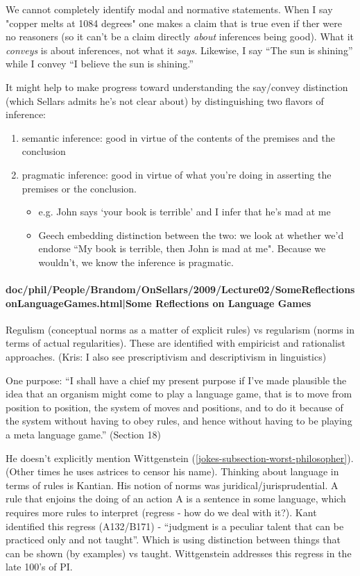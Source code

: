 \documentclass[12pt,a4paper]{report}
\begin{document}
We cannot completely identify modal and normative statements. When I say "copper melts at 1084 degrees" one makes a claim that is true even if ther were no reasoners (so it can't be a claim directly \emph{about} inferences being good). What it \emph{conveys} is about inferences, not what it \emph{says}. Likewise, I say ``The sun is shining'' while I convey ``I believe the sun is shining.''

It might help to make progress toward understanding the say/convey distinction (which Sellars admits he's not clear about) by distinguishing two flavors of inference:
\begin{enumerate}
\item semantic inference: good in virtue of the contents of the premises and the conclusion
\item pragmatic inference: good in virtue of what you're doing in asserting the premises or the conclusion.
 \begin{itemize}
 \item e.g. John says `your book is terrible' and I infer that he's mad at me
 \item Geech embedding distinction between the two: we look at whether we'd endorse ``My book is terrible, then John is mad at me". Because we wouldn't, we know the inference is pragmatic.

 \end{itemize}
\end{enumerate}
\paragraph{doc/phil/People/Brandom/OnSellars/2009/Lecture02/SomeReflectionsonLanguageGames.html|Some Reflections on Language Games}

Regulism (conceptual norms as a matter of explicit rules) vs regularism (norms in terms of actual regularities). These are identified with empiricist and rationalist approaches. (Kris: I also see prescriptivism and descriptivism in linguistics)

One purpose: ``I shall have a chief my present purpose if I've made plausible the idea that an organism might come to play a language game, that is to move from position to position, the system of moves and positions, and to do it because of the system without having to obey rules, and hence without having to be playing a meta language game.'' (Section 18)

He doesn't explicitly mention Wittgenstein (\ref{jokes-subsection-worst-philosopher}). (Other times he uses astrices to censor his name). Thinking about language in terms of rules is Kantian. His notion of norms was juridical/jurisprudential. A rule that enjoins the doing of an action A is a sentence in some language, which requires more rules to interpret (regress - how do we deal with it?). Kant identified this regress (A132/B171) - ``judgment is a peculiar talent that can be practiced only and not taught''. Which is using distinction between things that can be shown (by examples) vs taught. Wittgenstein addresses this regress in the late 100's of PI.
\end{document}

